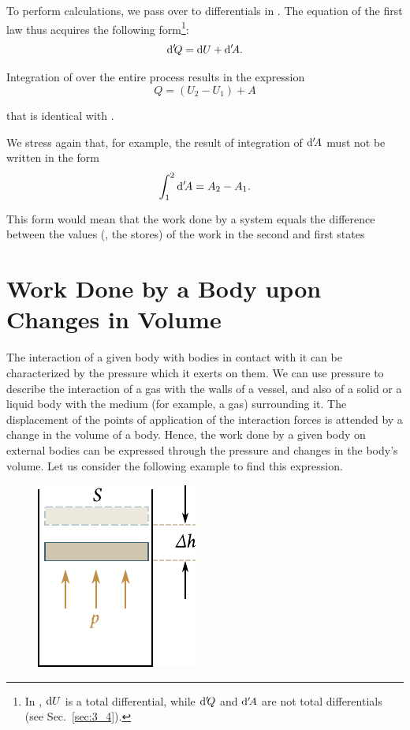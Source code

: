 To perform calculations, we pass over to differentials in . The equation of the first law thus acquires the following form\footnote{In , $\mathrm{d} U$ is a total differential, while $\mathrm{d}'\!Q$ and $\mathrm{d}'\!A$ are not total differentials (see Sec.~\ref{sec:3_4}).}:
\begin{equation}\label{eq:10_9}
	\mathrm{d}'\!Q = \mathrm{d} U + \mathrm{d}'\!A.
\end{equation}

\noindent
Integration of  over the entire process results in the expression
\begin{equation*}
	Q = (U_2 - U_1) + A
\end{equation*}

\noindent
that is identical with .

We stress again that, for example, the result of integration of $\mathrm{d}'\!A$ must not be written in the form
\begin{equation*}
	\int_{1}^{2} \mathrm{d}'\!A = A_2 - A_1.
\end{equation*}

\noindent
This form would mean that the work done by a system equals the difference between the values (\ie, the stores) of the work in the second and first states

\section{Work Done by a Body upon Changes in Volume}\label{sec:10_6}

The interaction of a given body with bodies in contact with it can be characterized by the pressure which it exerts on them. We can use pressure to describe the interaction of a gas with the walls of a vessel, and also of a solid or a liquid body with the medium (for example, a gas) surrounding it. The displacement of the points of application of the interaction forces is attended by a change in the volume of a body. Hence, the work done by a given body on external bodies can be expressed through the pressure and changes in the body's volume. Let us consider the following example to find this expression.

\begin{figure}[t]
	\begin{center}
		\includegraphics[scale=1.0]{figures/ch_10/fig_10_2.pdf}
		\caption[]{}
		\label{fig:10_2}
	\end{center}
	\vspace{-0.8cm}
\end{figure}

